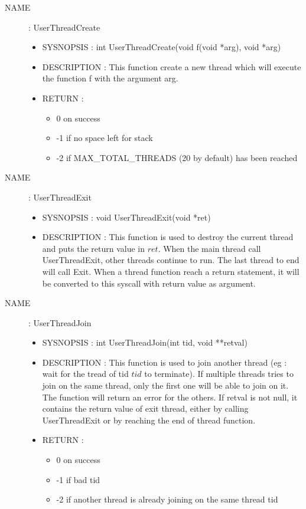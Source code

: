 \documentclass[a4paper,10pt]{article}
\begin{document}
\begin{description}
    \item [NAME] : UserThreadCreate
        \begin{itemize}
            \item SYSNOPSIS : int UserThreadCreate(void f(void *arg), void *arg)
            \item DESCRIPTION :
                This function create a new thread which will execute the function f with the
                argument arg.
            \item RETURN :
                \begin{itemize}
                    \item 0 on success
                    \item -1 if no space left for stack
                    \item -2 if MAX\_TOTAL\_THREADS (20 by default) has been reached
                \end{itemize}
        \end{itemize}


    \item [NAME] : UserThreadExit
        \begin{itemize}
            \item SYSNOPSIS : void UserThreadExit(void *ret)
            \item DESCRIPTION :
                This function is used to destroy the current thread and puts the return value in
                $ret$.
                When the main thread call UserThreadExit, other threads continue to
                run. The last thread to end will call Exit.
                When a thread function reach a return statement, it will be converted
                to this syscall with return value as argument.
        \end{itemize}

    \item [NAME] : UserThreadJoin
        \begin{itemize}
            \item SYSNOPSIS : int UserThreadJoin(int tid, void **retval)
            \item DESCRIPTION :
                This function is used to join another thread (eg : wait for the tread
                of tid $tid$ to terminate). If multiple threads tries to join on the same
                thread, only the first one will be able to join on it. The function
                will return an error for the others.
                If retval is not null, it contains the return value of exit thread,
                either by calling UserThreadExit or by reaching the end of thread function.
            \item RETURN :
                \begin{itemize}
                    \item 0 on success
                    \item -1 if bad tid
                    \item -2 if another thread is already joining on the same thread tid
                \end{itemize}
        \end{itemize}


\end{description}
\end{document}
